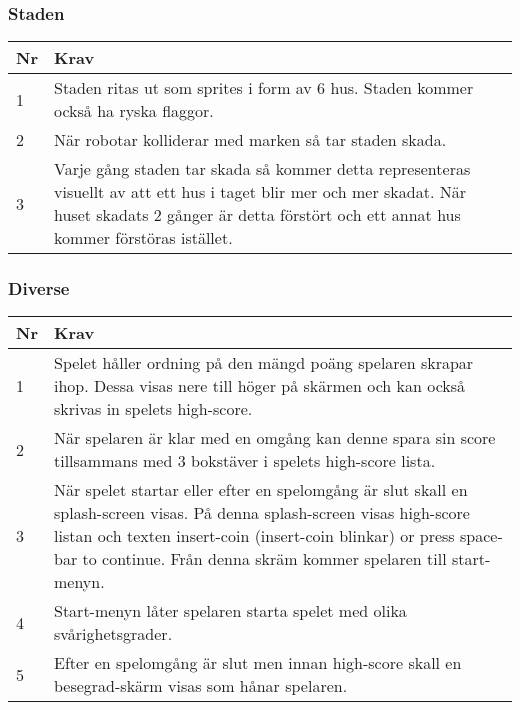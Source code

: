 \documentclass{TDP003mall}
\begin{document}
\subsubsection{Staden}
\begin{table}[!h]
\begin{tabularx}{\linewidth}{|l|X|}
\hline
Nr & Krav\\\hline
1 & Staden ritas ut som sprites i form av 6 hus. Staden kommer också ha ryska flaggor.\\\hline
2 & När robotar kolliderar med marken så tar staden skada.\\\hline
3 & Varje gång staden tar skada så kommer detta representeras visuellt av att ett hus i taget blir mer och mer skadat. När huset skadats 2 gånger är detta förstört och ett annat hus kommer förstöras istället.\\\hline
\end{tabularx}
\end{table}

\subsubsection{Diverse}
\begin{table}[!h]
\begin{tabularx}{\linewidth}{|l|X|}
\hline
Nr & Krav\\\hline
1 & Spelet håller ordning på den mängd poäng spelaren skrapar ihop. Dessa visas nere till höger på skärmen och kan också skrivas in spelets high-score.\\\hline
2 & När spelaren är klar med en omgång kan denne spara sin score tillsammans med 3 bokstäver i spelets high-score lista.\\\hline
3 & När spelet startar eller efter en spelomgång är slut skall en splash-screen visas. På denna splash-screen visas high-score listan och texten insert-coin (insert-coin blinkar) or press space-bar to continue. Från denna skräm kommer spelaren till start-menyn.\\\hline
4 & Start-menyn låter spelaren starta spelet med olika svårighetsgrader.\\\hline
5 & Efter en spelomgång är slut men innan high-score skall en besegrad-skärm visas som hånar spelaren.\\\hline
\end{tabularx}
\end{table}

 \newpage
 
\end{document}
